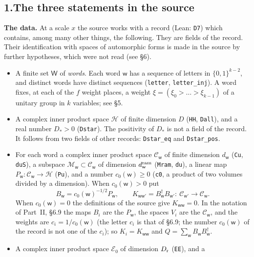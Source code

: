 \documentclass[11pt,letterpaper]{article}
\begin{document}
\subsection*{1.\quad The three statements in the source}

\textbf{The data.} At a scale $x$ the source works with a record (Lean: \texttt{D7}) which contains, among
many other things, the following. They are fields of the record. Their identification with spaces of
automorphic forms is made in the source by further hypotheses, which were not read (see \S6).
\begin{itemize}
\item A finite set $\mathsf W$ of \emph{words}. Each word $\mathsf w$ has a sequence of letters in
$\{0,1\}^{k-2}$, and distinct words have distinct sequences (\texttt{letter}, \texttt{letter\_inj}). A word
fixes, at each of the $f$ weight places, a weight $\xi=(\xi_0>\dots>\xi_{k-1})$ of a unitary group in $k$
variables; see \S5.
\item A complex inner product space $\mathcal H$ of finite dimension $D$ (\texttt{HH}, \texttt{Dall}), and a
real number $D_*>0$ (\texttt{Dstar}). The positivity of $D_*$ is not a field of the record. It follows from
two fields of other records: \texttt{Dstar\_eq} and \texttt{Dstar\_pos}.
\item For each word a complex inner product space $\mathcal C_{\mathsf w}$ of finite dimension
$d_{\mathsf w}$ (\texttt{Cu}, \texttt{duS}), a subspace $\mathcal M_{\mathsf w}\subset\mathcal C_{\mathsf w}$ of
dimension $d^{\rm ram}_{\mathsf w}$ (\texttt{Mram}, \texttt{du}), a linear map
$P_{\mathsf w}:\mathcal C_{\mathsf w}\to\mathcal H$ (\texttt{Pu}), and a number $c_0(\mathsf w)\ge0$
(\texttt{c0}, a product of two volumes divided by a dimension). When $c_0(\mathsf w)>0$ put
\begin{equation}\label{tr:K}
 B_{\mathsf w}=c_0(\mathsf w)^{-1/2}P_{\mathsf w},\qquad
 K_{\mathsf w\mathsf w'}=B_{\mathsf w}^\dagger B_{\mathsf w'}:\ \mathcal C_{\mathsf w'}\to\mathcal C_{\mathsf w}.
\end{equation}
When $c_0(\mathsf w)=0$ the definitions of the source give $K_{\mathsf w\mathsf w}=0$. In the notation of
Part~II, \S6.9 the maps $B_i$ are the $P_{\mathsf w}$, the spaces $V_i$ are the $\mathcal C_{\mathsf w}$, and the
weights are $c_i=1/c_0(\mathsf w)$ (the letter $c_i$ is that of \S6.9; the number $c_0(\mathsf w)$ of the
record is not one of the $c_i$); so $K_i=K_{\mathsf w\mathsf w}$ and
$Q=\sum_{\mathsf w}B_{\mathsf w}B_{\mathsf w}^\dagger$.
\item A complex inner product space $\mathcal E_0$ of dimension $D_{\rm r}$ (\texttt{EE}), and a

\end{itemize}
\end{document}
